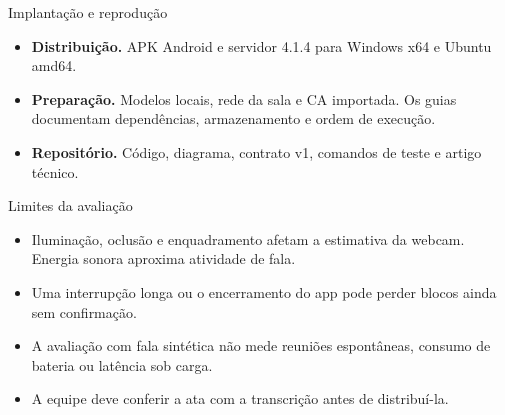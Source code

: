 \documentclass[aspectratio=169,t,xcolor=table]{beamer}
\begin{document}
\begin{frame}{Implantação e reprodução}
  \begin{itemize}
    \item \textbf{Distribuição.} APK Android e servidor 4.1.4 para Windows x64 e Ubuntu amd64.
    \item \textbf{Preparação.} Modelos locais, rede da sala e CA importada. Os guias documentam dependências, armazenamento e ordem de execução.
    \item \textbf{Repositório.} Código, diagrama, contrato v1, comandos de teste e artigo técnico.
  \end{itemize}
\end{frame}

\begin{frame}{Limites da avaliação}
  \begin{itemize}
    \item Iluminação, oclusão e enquadramento afetam a estimativa da webcam. Energia sonora aproxima atividade de fala.
    \item Uma interrupção longa ou o encerramento do app pode perder blocos ainda sem confirmação.
    \item A avaliação com fala sintética não mede reuniões espontâneas, consumo de bateria ou latência sob carga.
    \item A equipe deve conferir a ata com a transcrição antes de distribuí-la.
  \end{itemize}
\end{frame}
\end{document}
